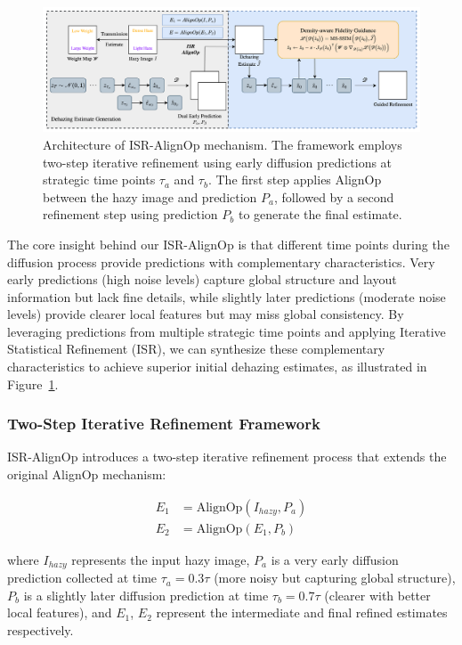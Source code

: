 \documentclass{article}
\begin{document}
\begin{figure}[t]
\centering
\includegraphics[width=\textwidth]{isr_alignop.jpg}
\caption{Architecture of ISR-AlignOp mechanism. The framework employs two-step iterative refinement using early diffusion predictions at strategic time points $\tau_a$ and $\tau_b$. The first step applies AlignOp between the hazy image and prediction $P_a$, followed by a second refinement step using prediction $P_b$ to generate the final estimate.}
\label{fig:isr_alignop}
\end{figure}

The core insight behind our ISR-AlignOp is that different time points during the diffusion process provide predictions with complementary characteristics. Very early predictions (high noise levels) capture global structure and layout information but lack fine details, while slightly later predictions (moderate noise levels) provide clearer local features but may miss global consistency. By leveraging predictions from multiple strategic time points and applying Iterative Statistical Refinement (ISR), we can synthesize these complementary characteristics to achieve superior initial dehazing estimates, as illustrated in Figure~\ref{fig:isr_alignop}.

\subsubsection{Two-Step Iterative Refinement Framework}

ISR-AlignOp introduces a two-step iterative refinement process that extends the original AlignOp mechanism:

\begin{align}
E_1 &= \text{AlignOp}(I_{hazy}, P_a) \label{eq:isr_step1} \\
E_2 &= \text{AlignOp}(E_1, P_b) \label{eq:isr_step2}
\end{align}

where $I_{hazy}$ represents the input hazy image, $P_a$ is a very early diffusion prediction collected at time $\tau_a = 0.3\tau$ (more noisy but capturing global structure), $P_b$ is a slightly later diffusion prediction at time $\tau_b = 0.7\tau$ (clearer with better local features), and $E_1$, $E_2$ represent the intermediate and final refined estimates respectively.
\end{document}
